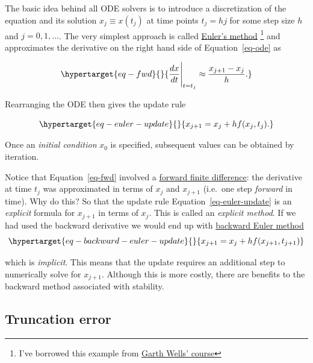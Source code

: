 \documentclass[
  letterpaper,
  DIV=11,
  numbers=noendperiod]{scrreprt}
\theoremstyle{definition}
\theoremstyle{remark}
\begin{document}
The basic idea behind all ODE solvers is to introduce a discretization
of the equation and its solution \(x_j\equiv x(t_j)\) at time points
\(t_j = hj\) for some step size \(h\) and \(j=0, 1, \ldots\). The very
simplest approach is called
\href{https://en.wikipedia.org/wiki/Euler_method}{Euler's method}
\footnote{I've borrowed this example from
  \href{https://github.com/CambridgeEngineering/PartIA-Computing-Michaelmas/blob/main/11\%20Complexity.ipynb}{Garth
  Wells' course}} and approximates the derivative on the right hand side
of Equation~\ref{eq-ode} as

\begin{equation}\protect\hypertarget{eq-fwd}{}{
\frac{dx}{dt}\Bigg|_{t=t_j} \approx \frac{x_{j+1} - x_j}{h}.
}\label{eq-fwd}\end{equation}

Rearranging the ODE then gives the update rule

\begin{equation}\protect\hypertarget{eq-euler-update}{}{
x_{j+1} = x_j + hf(x_j, t_j).
}\label{eq-euler-update}\end{equation}

Once an \emph{initial condition} \(x_0\) is specified, subsequent values
can be obtained by iteration.

Notice that Equation~\ref{eq-fwd} involved a
\href{https://en.wikipedia.org/wiki/Finite_difference}{forward finite
difference}: the derivative at time \(t_j\) was approximated in terms of
\(x_j\) and \(x_{j+1}\) (i.e.~one step \emph{forward} in time). Why do
this? So that the update rule Equation~\ref{eq-euler-update} is an
\emph{explicit} formula for \(x_{j+1}\) in terms of \(x_j\). This is
called an \emph{explicit method}. If we had used the backward derivative
we would end up with
\href{https://en.wikipedia.org/wiki/Backward_Euler_method}{backward
Euler method}
\begin{equation}\protect\hypertarget{eq-backward-euler-update}{}{
x_{j+1} = x_j + hf(x_{j+1}, t_{j+1})
}\label{eq-backward-euler-update}\end{equation}

which is \emph{implicit}. This means that the update requires an
additional step to numerically solve for \(x_{j+1}\). Although this is
more costly, there are benefits to the backward method associated with
stability.

\hypertarget{truncation-error}{%
\subsection{Truncation error}\label{truncation-error}}
\end{document}
